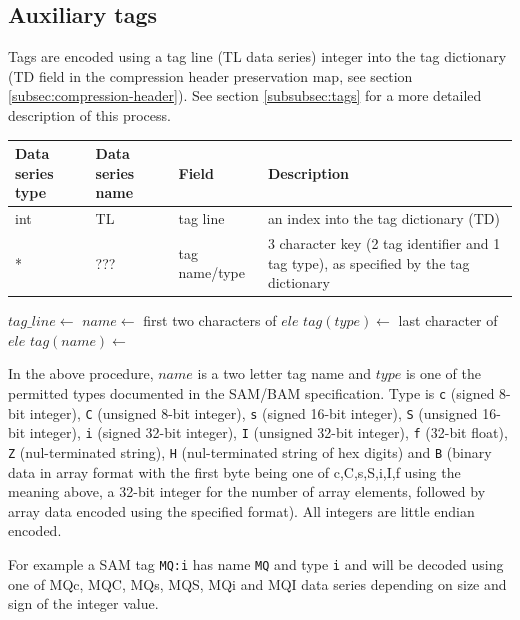 \documentclass[a4paper]{article}
\begin{document}
\subsection{Auxiliary tags}
\label{subsec:tags}

Tags are encoded using a tag line (TL data series) integer into the tag dictionary (TD field in the compression header preservation map, see section \ref{subsec:compression-header}).
See section \ref{subsubsec:tags} for a more detailed description of this process.

\begin{tabular}{|>{\raggedright}p{70pt}|>{\raggedright}p{75pt}|>{\raggedright}p{90pt}|>{\raggedright}p{200pt}|}
\hline
\textbf{Data series type} & \textbf{Data series name} & \textbf{Field} & \textbf{Description}\tabularnewline
\hline
int & TL & tag line & an index into the tag dictionary (TD)\tabularnewline
\hline
* & ??? & tag name/type & 3 character key (2 tag identifier and 1 tag type), as specified by the tag dictionary\tabularnewline
\hline
\end{tabular}

\vskip 20pt
\begin{algorithmic}[1]
\State $tag\_line\gets$ 
  \State $name\gets$ first two characters of $ele$
  \State $tag(type)\gets$ last character of $ele$
  \State $tag(name)\gets$ 
\EndFor
\EndProcedure
\end{algorithmic}

In the above procedure, $name$ is a two letter tag name and $type$ is one of the permitted types documented in the SAM/BAM specification.
Type is \texttt{c} (signed 8-bit integer), \texttt{C} (unsigned 8-bit integer), \texttt{s} (signed 16-bit integer), \texttt{S} (unsigned 16-bit integer), \texttt{i} (signed 32-bit integer), \texttt{I} (unsigned 32-bit integer), \texttt{f} (32-bit float), \texttt{Z} (nul-terminated string), \texttt{H} (nul-terminated string of hex digits) and \texttt{B} (binary data in array format with the first byte being one of c,C,s,S,i,I,f using the meaning above, a 32-bit integer for the number of array elements, followed by array data encoded using the specified format).  All integers are little endian encoded.

For example a SAM tag \texttt{MQ:i} has name \texttt{MQ} and type \texttt{i} and will be decoded using one of MQc, MQC, MQs, MQS, MQi and MQI data series depending on size and sign of the integer value.
\end{document}
